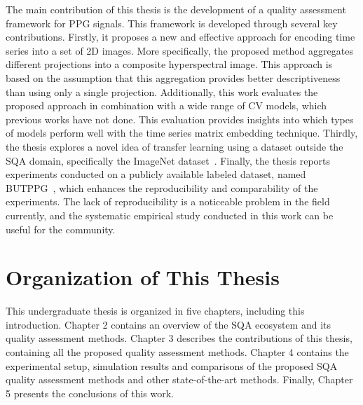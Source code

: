 The main contribution of this thesis is the development of a quality assessment framework for \gls{PPG} signals. This framework is developed through several key contributions. Firstly, it proposes a new and effective approach for encoding time series into a set of 2D images. More specifically, the proposed method aggregates different projections into a composite hyperspectral image. This approach is based on the assumption that this aggregation provides better descriptiveness than using only a single projection. Additionally, this work evaluates the proposed approach in combination with a wide range of \gls{CV} models, which previous works have not done. This evaluation provides insights into which types of models perform well with the time series matrix embedding technique. Thirdly, the thesis explores a novel idea of transfer learning using a dataset outside the \gls{SQA} domain, specifically the ImageNet dataset~\cite{ImageNet}. Finally, the thesis reports experiments conducted on a publicly available labeled dataset, named \gls{BUTPPG}~\cite{butppg}, which enhances the reproducibility and comparability of the experiments. The lack of reproducibility is a noticeable problem in the field currently, and the systematic empirical study conducted in this work can be useful for the community.

\section{Organization of This Thesis}
\label{sec:organization}

This undergraduate thesis is organized in five chapters, including this introduction. Chapter 2 contains an overview of the \gls{SQA} ecosystem and its quality assessment methods. Chapter 3 describes the contributions of this thesis, containing all the proposed quality assessment methods. Chapter 4 contains the experimental setup, simulation results and comparisons of the proposed \gls{SQA} quality assessment methods and other state-of-the-art methods. Finally, Chapter 5 presents the conclusions of this work. 


